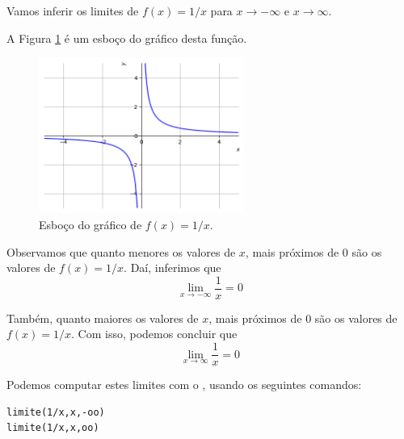 \cleardoublepage\documentclass[../main.tex]{subfiles}
\begin{document}
\begin{ex}
  Vamos inferir os limites de $f(x) = 1/x$ para $x\to -\infty$ e $x\to \infty$.
  \begin{solution}
  A Figura \ref{fig:lim_xinf_1x} é um esboço do gráfico desta função.

\begin{figure}[H]
  \centering
  \includegraphics[width=0.6\textwidth]{fig_lim/fig_lim_xinf_1x}
  \caption{Esboço do gráfico de $f(x) = 1/x$.}
  \label{fig:lim_xinf_1x}
\end{figure}

Observamos que quanto menores os valores de $x$, mais próximos de $0$ são os valores de $f(x)=1/x$. Daí, inferimos que
\begin{equation*}
  \lim_{x\to -\infty} \frac{1}{x} = 0
\end{equation*}

Também, quanto maiores os valores de $x$, mais próximos de $0$ são os valores de $f(x)=1/x$. Com isso, podemos concluir que
\begin{equation*}
  \lim_{x\to \infty} \frac{1}{x} = 0
\end{equation*}

Podemos computar estes limites com o \geogebra, usando os seguintes comandos:
\begin{verbatim}
limite(1/x,x,-oo)
limite(1/x,x,oo)
\end{verbatim}
  \end{solution}
\end{ex}
\end{document}
